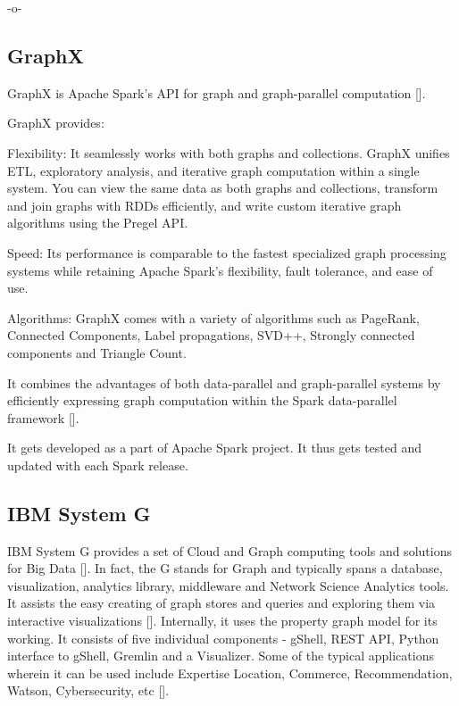     -o-
    
\subsection{GraphX}

GraphX is Apache Spark's API for graph and graph-parallel
computation [\cite{www-graphX}].
    
GraphX provides:
    
    Flexibility: It seamlessly works with both graphs and
    collections. GraphX unifies ETL, exploratory analysis, and
    iterative graph computation within a single system. You can view
    the same data as both graphs and collections, transform and join
    graphs with RDDs efficiently, and write custom iterative graph
    algorithms using the Pregel API.
    
    Speed: Its performance is comparable to the fastest specialized
    graph processing systems while retaining Apache Spark's
    flexibility, fault tolerance, and ease of use.
    
    Algorithms: GraphX comes with a variety of algorithms such as
    PageRank, Connected Components, Label propagations, SVD++,
    Strongly connected components and Triangle Count.

    It combines the advantages of both data-parallel and
    graph-parallel systems by efficiently expressing graph computation
    within the Spark data-parallel framework [\cite{www-graphX1}].

    It gets developed as a part of Apache Spark project. It thus gets
    tested and updated with each Spark release.
    
\subsection{IBM System G}

IBM System G provides a set of Cloud and Graph computing tools and
solutions for Big Data [\cite{IBMSystemGDocumentation-1}].  In fact, the
G stands for Graph and typically spans a database, visualization,
analytics library, middleware and Network Science Analytics tools.  It
assists the easy creating of graph stores and queries and exploring
them via interactive visualizations [\cite{IBMSystemGDocumentation-2}].
Internally, it uses the property graph model for its working.  It
consists of five individual components - gShell, REST API, Python
interface to gShell, Gremlin and a Visualizer.  Some of the typical
applications wherein it can be used include Expertise Location,
Commerce, Recommendation, Watson, Cybersecurity,
etc [\cite{IBMSystemGPaper}].

